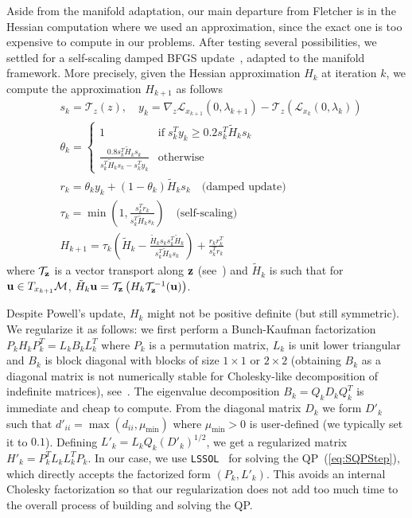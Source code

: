 Aside from the manifold adaptation, our main departure from Fletcher is in the Hessian computation where we used an approximation, since the exact one is too expensive to compute in our problems.
After testing several possibilities, we settled for a self-scaling damped BFGS update~\cite{nocedal:mp:1993,nocedal:book:2006}, adapted to the manifold framework.
More precisely, given the Hessian approximation $H_k$ at iteration $k$, we compute the approximation $H_{k+1}$ as follows
\begin{align}
  &s_k = \mathcal{T}_z(z), \quad y_k = \nabla_z \mathcal{L}_{x_{k+1}}(0,\lambda_{k+1}) - \mathcal{T}_z(\mathcal{L}_{x_{k}}(0,\lambda_{k})) \nonumber\\
  &\theta_k = \left\{\begin{array}{ll}
    1 & \mbox{if} \; s_k^T y_k \geq 0.2 s_k^T \tilde{H}_k s_k \\
    \frac{0.8 s_k^T \tilde{H}_k s_k}{s_k^T \tilde{H}_k s_k - s_k^T y_k} & \mbox{otherwise}
  \end{array}\right. \nonumber \\
  &r_k = \theta_k y_k + \left(1-\theta_k\right) \tilde{H}_k s_k \quad \mbox{(damped update)} \nonumber \\
  &\tau_k = \min\left(1, \frac{s_k^T r_k}{s_k^T \tilde{H}_k s_k} \right) \quad \mbox{(self-scaling)} \nonumber \\
  &H_{k+1} = \tau_k \left(\tilde{H}_k - \frac{\tilde{H}_k s_k s_k^T \tilde{H}_k}{s_k^T \tilde{H}_k s_k} \right) + \frac{r_k r_k^T}{s_k^T r_k} \nonumber
\end{align}
where $\mathcal{T}_{\bf z}$ is a vector transport along ${\bf z}$ (see~\cite{absil:book:2008}) and $\tilde{H}_k$ is such that for ${\bf u} \in T_{x_{k+1}} \mathcal{M}$, $\tilde{H}_k {\bf u} = \mathcal{T}_{\bf z}\left(H_k \mathcal{T}_{\bf z}^{-1}({\bf u}) \right)$.

Despite Powell's update, $H_{k}$ might not be positive definite (but still symmetric).
We regularize it as follows: we first perform a Bunch-Kaufman factorization $P_k H_k P_k^T= L_k B_k L_k^T$ where $P_k$ is a permutation matrix, $L_k$ is unit lower triangular and $B_k$ is block diagonal with blocks of size $1 \times 1$ or $2\times 2$ (obtaining $B_k$ as a diagonal matrix is not numerically stable for Cholesky-like decomposition of indefinite matrices), see~\cite{golub:book:1996}.
The eigenvalue decomposition $B_k = Q_k D_k Q_k^T$ is immediate and cheap to compute.
From the diagonal matrix $D_k$ we form $D'_k$ such that $d'_{ii} = \max\left(d_{ii},\mu_{\min}\right)$ where $\mu_{\min}>0$ is user-defined (we typically set it to $0.1$).
Defining $L'_k = L_k Q_k {(D'_k)}^{1/2}$, we get a regularized matrix $H'_k = P_k^T L_k L_k^T P_k$.
In our case, we use {\tt LSSOL}~\cite{gill:techrep:1986} for solving the QP~(\ref{eq:SQPStep}), which directly accepts the factorized form $(P_k, L'_k)$.
This avoids an internal Cholesky factorization so that our regularization does not add too much time to the overall process of building and solving the QP.\@


